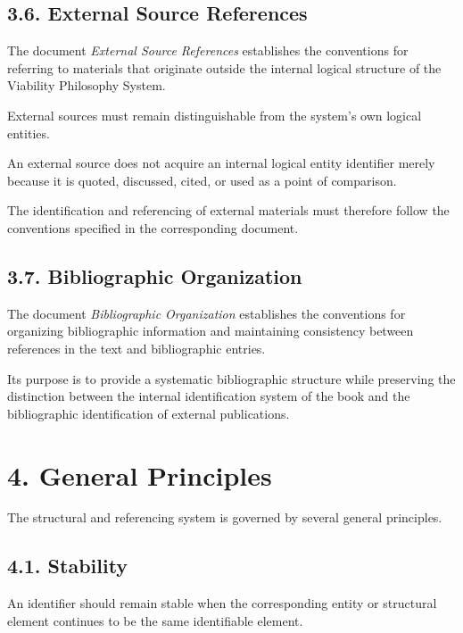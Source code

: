 \subsection*{3.6. External Source References}

The document \textit{External Source References}
establishes the conventions for referring to
materials that originate outside the internal
logical structure of the Viability Philosophy
System.

External sources must remain distinguishable
from the system's own logical entities.

An external source does not acquire an internal
logical entity identifier merely because it is
quoted, discussed, cited, or used as a point of
comparison.

The identification and referencing of external
materials must therefore follow the conventions
specified in the corresponding document.

\subsection*{3.7. Bibliographic Organization}

The document \textit{Bibliographic Organization}
establishes the conventions for organizing
bibliographic information and maintaining
consistency between references in the text
and bibliographic entries.

Its purpose is to provide a systematic
bibliographic structure while preserving
the distinction between the internal
identification system of the book and
the bibliographic identification of
external publications.


\section*{4. General Principles}

The structural and referencing system is governed
by several general principles.

\subsection*{4.1. Stability}

An identifier should remain stable when the
corresponding entity or structural element
continues to be the same identifiable element.

